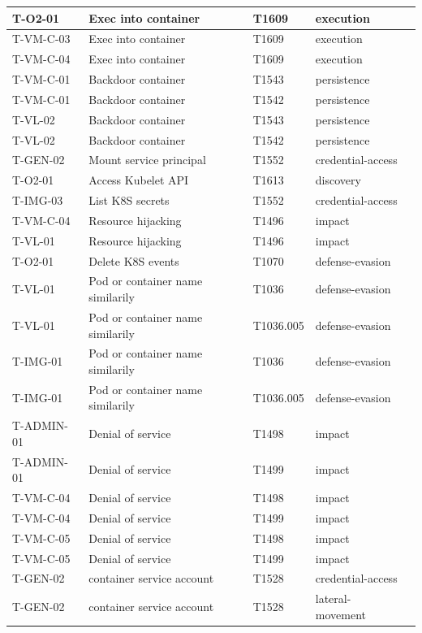 \begin{longtable}{|l|l|l|l|l|}
T-O2-01 & Exec into container & T1609 & execution \\ \hline
T-VM-C-03 & Exec into container & T1609 & execution \\ \hline
T-VM-C-04 & Exec into container & T1609 & execution \\ \hline
T-VM-C-01 & Backdoor container & T1543 & persistence \\ \hline
T-VM-C-01 & Backdoor container & T1542 & persistence \\ \hline
T-VL-02 & Backdoor container & T1543 & persistence \\ \hline
T-VL-02 & Backdoor container & T1542 & persistence \\ \hline
T-GEN-02 & Mount service principal & T1552 & credential-access \\ \hline
T-O2-01 & Access Kubelet API & T1613 & discovery \\ \hline
T-IMG-03 & List K8S secrets & T1552 & credential-access \\ \hline
T-VM-C-04 & Resource hijacking & T1496 & impact \\ \hline
T-VL-01 & Resource hijacking & T1496 & impact \\ \hline
T-O2-01 & Delete K8S events & T1070 & defense-evasion \\ \hline
T-VL-01 & Pod or container name similarily & T1036 & defense-evasion \\ \hline
T-VL-01 & Pod or container name similarily & T1036.005 & defense-evasion \\ \hline
T-IMG-01 & Pod or container name similarily & T1036 & defense-evasion \\ \hline
T-IMG-01 & Pod or container name similarily & T1036.005 & defense-evasion \\ \hline
T-ADMIN-01 & Denial of service & T1498 & impact \\ \hline
T-ADMIN-01 & Denial of service & T1499 & impact \\ \hline
T-VM-C-04 & Denial of service & T1498 & impact \\ \hline
T-VM-C-04 & Denial of service & T1499 & impact \\ \hline
T-VM-C-05 & Denial of service & T1498 & impact \\ \hline
T-VM-C-05 & Denial of service & T1499 & impact \\ \hline
T-GEN-02 & container service account & T1528 & credential-access \\ \hline
T-GEN-02 & container service account & T1528 & lateral-movement \\ \hline

\end{longtable}
